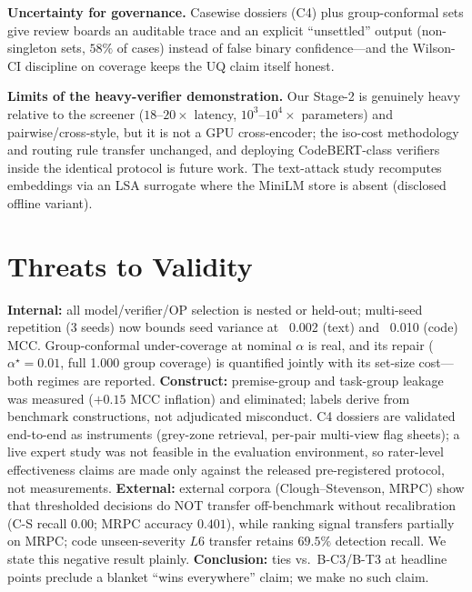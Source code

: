 \documentclass[conference]{IEEEtran}
\begin{document}
\textbf{Uncertainty for governance.} Casewise dossiers (C4) plus group-conformal sets give review
boards an auditable trace and an explicit ``unsettled'' output (non-singleton sets, $58\%$ of
cases) instead of false binary confidence---and the Wilson-CI discipline on coverage keeps the UQ
claim itself honest.

\textbf{Limits of the heavy-verifier demonstration.} Our Stage-2 is genuinely heavy relative to
the screener ($18$--$20\times$ latency, $10^3$--$10^4\times$ parameters) and pairwise/cross-style,
but it is not a GPU cross-encoder; the iso-cost methodology and routing rule transfer
unchanged, and deploying CodeBERT-class verifiers inside the identical protocol is future work.
The text-attack study recomputes embeddings via an LSA surrogate where the MiniLM store is absent
(disclosed offline variant).

\section{Threats to Validity}
\label{sec:threats}
\textbf{Internal:} all model/verifier/OP selection is nested or held-out; multi-seed
repetition (3 seeds) now bounds seed variance at \pm~0.002 (text) and \pm~0.010 (code) MCC.
Group-conformal under-coverage at nominal $\alpha$ is real, and its repair ($\alpha^{\star}{=}0.01$,
full 1.000 group coverage) is quantified jointly with its set-size cost---both regimes are
reported. \textbf{Construct:}
premise-group and task-group leakage was measured ($+0.15$ MCC inflation) and eliminated;
labels derive from benchmark constructions, not adjudicated misconduct. C4 dossiers are
validated end-to-end as instruments (grey-zone retrieval, per-pair multi-view flag sheets);
a live expert study was not feasible in the evaluation environment, so rater-level
effectiveness claims are made only against the released pre-registered protocol, not
measurements. \textbf{External:} external corpora (Clough--Stevenson, MRPC) show that
thresholded decisions do NOT transfer off-benchmark without recalibration (C-S recall $0.00$;
MRPC accuracy $0.401$), while ranking signal transfers partially on MRPC; code unseen-severity
$L6$ transfer retains $69.5\%$ detection recall. We state this negative result plainly. \textbf{Conclusion:}
ties vs.\ B-C3/B-T3 at headline points preclude a blanket ``wins everywhere'' claim; we make no such claim.
\end{document}
